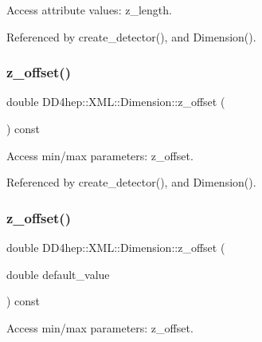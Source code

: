 Access attribute values\+: z\+\_\+length. 



Referenced by create\+\_\+detector(), and Dimension().

\hypertarget{struct_d_d4hep_1_1_x_m_l_1_1_dimension_a3630a487dbfca8d230026cf39a2d5348}{}\label{struct_d_d4hep_1_1_x_m_l_1_1_dimension_a3630a487dbfca8d230026cf39a2d5348} 
\subsubsection{\texorpdfstring{z\+\_\+offset()}{z\_offset()}\hspace{0.1cm}{\footnotesize\ttfamily [1/2]}}
{\footnotesize\ttfamily double D\+D4hep\+::\+X\+M\+L\+::\+Dimension\+::z\+\_\+offset (\begin{DoxyParamCaption}{ }\end{DoxyParamCaption}) const}



Access min/max parameters\+: z\+\_\+offset. 



Referenced by create\+\_\+detector(), and Dimension().

\hypertarget{struct_d_d4hep_1_1_x_m_l_1_1_dimension_a193d27d00aaf58815c1d7331dc0248e0}{}\label{struct_d_d4hep_1_1_x_m_l_1_1_dimension_a193d27d00aaf58815c1d7331dc0248e0} 
\subsubsection{\texorpdfstring{z\+\_\+offset()}{z\_offset()}\hspace{0.1cm}{\footnotesize\ttfamily [2/2]}}
{\footnotesize\ttfamily double D\+D4hep\+::\+X\+M\+L\+::\+Dimension\+::z\+\_\+offset (\begin{DoxyParamCaption}\item[{double}]{default\+\_\+value }\end{DoxyParamCaption}) const}



Access min/max parameters\+: z\+\_\+offset. 

